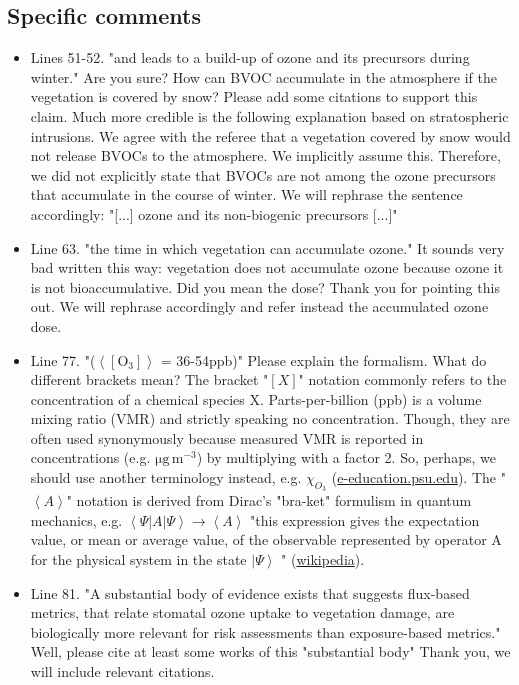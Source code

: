 \documentclass{scrartcl}
\begin{document}
\subsection*{Specific comments} 
\begin{itemize}
    
\item {\color{blue}Lines 51-52. "and leads to a build-up of ozone and its precursors during winter." Are you sure? How can BVOC accumulate in the atmosphere if the vegetation is covered by snow? Please add some citations to support this claim. Much more credible is the following explanation based on stratospheric intrusions.}
We agree with the referee that a vegetation covered by snow would not release BVOCs to the atmosphere. We implicitly assume this. Therefore, we did not explicitly state that BVOCs are not among the ozone precursors that accumulate in the course of winter. We will rephrase the sentence accordingly: "[...] ozone and its non-biogenic precursors [...]"

\item {\color{blue}Line 63. "the time in which vegetation can accumulate ozone." 
It sounds very bad written this way: vegetation does not accumulate ozone because ozone it is not bioaccumulative. Did you mean the dose?}
Thank you for pointing this out. We will rephrase accordingly and refer instead the accumulated ozone dose.

\item {\color{blue}Line 77. "($\left<[\mathrm{O_3}]\right>$ = 36-54ppb)" Please explain the formalism. What do different brackets mean?} The bracket "$[X]$" notation commonly refers to the concentration of a chemical species X. Parts-per-billion (ppb) is a volume mixing ratio (VMR) and strictly speaking no concentration. Though, they are often used synonymously because measured VMR is reported in concentrations (e.g. $\mathrm{\mu g\,m^{-3}}$) by multiplying with a factor 2. So, perhaps, we should use another terminology instead, e.g. $\chi_{O_3}$ (\href{https://www.e-education.psu.edu/meteo300/node/534}{e-education.psu.edu}). The "$\left<A\right>$" notation is derived from Dirac's "bra-ket" formulism in quantum mechanics, e.g. $\left<\Psi |A|\Psi \right>\rightarrow \left<A\right>$ "this expression gives the expectation value, or mean or average value, of the observable represented by operator A for the physical system in the state $\left|\Psi \right>$ " (\href{https://en.wikipedia.org/wiki/Bra%E2%80%93ket_notation}{wikipedia}).

\item {\color{blue}Line 81. "A substantial body of evidence exists that suggests flux-based metrics, that relate stomatal ozone uptake to vegetation damage, are biologically more relevant for risk assessments than exposure-based metrics." 
Well, please cite at least some works of this "substantial body"} Thank you, we will include relevant citations.


\end{itemize}
\end{document}
